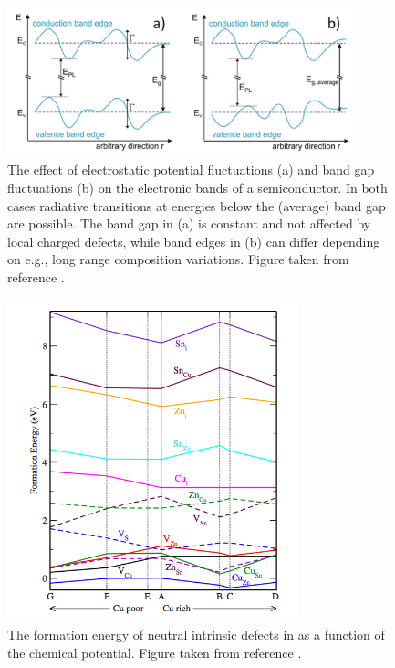 \begin{figure}[h!]
  \centering
    \includegraphics[width=0.9\textwidth]{figures/band_tail_fig.png}
    \caption{The effect of electrostatic potential fluctuations (a) and band gap fluctuations (b) on the electronic bands of a semiconductor. In both cases radiative transitions at energies below the (average) band gap are possible. The band gap in (a) is constant and not affected by local charged defects, while band edges in (b) can differ depending on e.g., long range composition variations. Figure taken from reference .}
  \label{band_tail_fig}
\end{figure}


\begin{figure}[h!]
  \centering
    \includegraphics[width=0.75\textwidth]{figures/Chen_pt_formE.png}
    \caption{The formation energy of neutral intrinsic defects in \CZTS as a function of the chemical potential. Figure taken from reference .}
  \label{Chen_pt1}
\end{figure}

